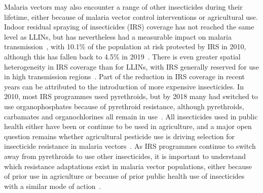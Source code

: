 \begin{refsection}
Malaria vectors may also encounter a range of other insecticides during their lifetime, either because of malaria vector control interventions or agricultural use.
%
Indoor residual spraying of insecticides (IRS) coverage has not reached the same level as LLINs, but has nevertheless had a measurable impact on malaria transmission~\parencite{Bhatt2015}, with 10.1\% of the population at risk protected by IRS in 2010, although this has fallen back to 4.5\% in 2019~\parencite{WHO2019WMR}.
%
There is even greater spatial heterogeneity in IRS coverage than for LLINs, with IRS generally reserved for use in high transmission regions~\parencite{WHO2019WMR}.
%
Part of the reduction in IRS coverage in recent years can be attributed to the introduction of more expensive insecticides.
%
In 2010, most IRS programmes used pyrethroids, but by 2018 many had switched to use organophosphates because of pyrethroid resistance, although pyrethroids, carbamates and organochlorines all remain in use~\parencite{WHO2019WMR}.
%
All insecticides used in public health either have been or continue to be used in agriculture, and a major open question remains whether agricultural pesticide use is driving selection for insecticide resistance in malaria vectors~\parencite{Georghiou1990,Nkya2013,Philbert2014,Reid2016}.
%
As IRS programmes continue to switch away from pyrethroids to use other insecticides, it is important to understand which resistance adaptations exist in malaria vector populations, either because of prior use in agriculture or because of prior public health use of insecticides with a similar mode of action~\parencite{Fouet2020}.



\end{refsection}
